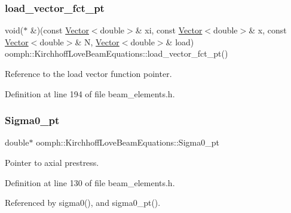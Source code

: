 \subsubsection{\texorpdfstring{load\+\_\+vector\+\_\+fct\+\_\+pt}{load\_vector\_fct\_pt}}
{\footnotesize\ttfamily void($\ast$ \&)(const \hyperlink{classoomph_1_1Vector}{Vector}$<$double$>$\& xi, const \hyperlink{classoomph_1_1Vector}{Vector}$<$double$>$\& x, const \hyperlink{classoomph_1_1Vector}{Vector}$<$double$>$\& N, \hyperlink{classoomph_1_1Vector}{Vector}$<$double$>$\& load) oomph\+::\+Kirchhoff\+Love\+Beam\+Equations\+::load\+\_\+vector\+\_\+fct\+\_\+pt()\hspace{0.3cm}{\ttfamily [inline]}}



Reference to the load vector function pointer. 



Definition at line 194 of file beam\+\_\+elements.\+h.

\mbox{\label{classoomph_1_1KirchhoffLoveBeamEquations_a87d8ff0b264ae3327ee44975774f8c2f}} 
\subsubsection{\texorpdfstring{Sigma0\+\_\+pt}{Sigma0\_pt}}
{\footnotesize\ttfamily double$\ast$ oomph\+::\+Kirchhoff\+Love\+Beam\+Equations\+::\+Sigma0\+\_\+pt\hspace{0.3cm}{\ttfamily [private]}}



Pointer to axial prestress. 



Definition at line 130 of file beam\+\_\+elements.\+h.



Referenced by sigma0(), and sigma0\+\_\+pt().

\mbox{\label{classoomph_1_1KirchhoffLoveBeamEquations_a3e89080f7df640c70c8ec3bf85fb74c9}} 
